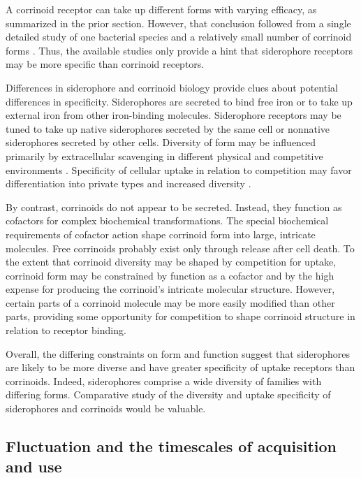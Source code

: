 \documentclass[\mydocfontsize]{article}
\begin{document}
\begin{multicols}{2}
A corrinoid receptor can take up different forms with varying efficacy, as summarized in the prior section. However, that conclusion followed from a single detailed study of one bacterial species and a relatively small number of corrinoid forms \autocite{degnan14human}. Thus, the available studies only provide a hint that siderophore receptors may be more specific than corrinoid receptors. 

Differences in siderophore and corrinoid biology provide clues about potential differences in specificity. Siderophores are secreted to bind free iron or to take up external iron from other iron-binding molecules. Siderophore receptors may be tuned to take up native siderophores secreted by the same cell or nonnative siderophores secreted by other cells. Diversity of form may be influenced primarily by extracellular scavenging in different physical and competitive environments \autocite{kummerli14habitat}. Specificity of cellular uptake in relation to competition may favor differentiation into private types and increased diversity \autocite[see earlier section \textit{Why are there different types of corrinoid?}]{niehus17the-evolution}.

By contrast, corrinoids do not appear to be secreted. Instead, they function as cofactors for complex biochemical transformations. The special biochemical requirements of cofactor action shape corrinoid form into large, intricate molecules. Free corrinoids probably exist only through release after cell death. To the extent that corrinoid diversity may be shaped by competition for uptake, corrinoid form may be constrained by function as a cofactor and by the high expense for producing the corrinoid's intricate molecular structure. However, certain parts of a corrinoid molecule may be more easily modified than other parts, providing some opportunity for competition to shape corrinoid structure in relation to receptor binding.

Overall, the differing constraints on form and function suggest that siderophores are likely to be more diverse and have greater specificity of uptake receptors than corrinoids. Indeed, siderophores comprise a wide diversity of families with differing forms. Comparative study of the diversity and uptake specificity of siderophores and corrinoids would be valuable.

\subsection{Fluctuation and the timescales of acquisition and use}


\end{multicols}
\end{document}
